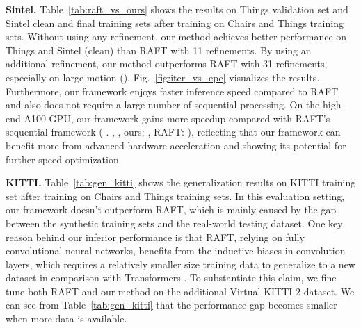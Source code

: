 \documentclass[10pt,twocolumn,letterpaper]{article}
\begin{document}
{\bf Sintel.} Table~\ref{tab:raft_vs_ours} shows the results on Things validation set and Sintel clean and final training sets after training on Chairs and Things training sets. Without using any refinement, our method achieves better performance on Things and Sintel (clean) than RAFT with 11 refinements. By using an additional refinement, our method outperforms RAFT with 31 refinements, especially on large motion (). Fig.~\ref{fig:iter_vs_epe} visualizes the results. Furthermore, our framework enjoys faster inference speed compared to RAFT and also does not require a large number of sequential processing. On the high-end A100 GPU, our framework gains more speedup compared with RAFT's sequential framework ( \vs. , \ie, ours: , RAFT: ), reflecting that our framework can benefit more from advanced hardware acceleration and showing its potential for further speed optimization.










{\bf KITTI.} Table~\ref{tab:gen_kitti} shows the generalization results on KITTI training set after training on Chairs and Things training sets. In this evaluation setting, our framework doesn't outperform RAFT, which is mainly caused by the gap between the synthetic training sets and the real-world testing dataset. One key reason behind our inferior performance is that RAFT, relying on fully convolutional neural networks, benefits from the inductive biases in convolution layers, which requires a relatively smaller size training data to generalize to a new dataset in comparison with Transformers \cite{dosovitskiy2020image, d2021convit,xu2021vitae,zhang2022vitaev2}. To substantiate this claim, we fine-tune both RAFT and our method on the additional Virtual KITTI 2 \cite{cabon2020virtual} dataset. We can see from Table~\ref{tab:gen_kitti} that the performance gap becomes smaller when more data is available.
\end{document}
